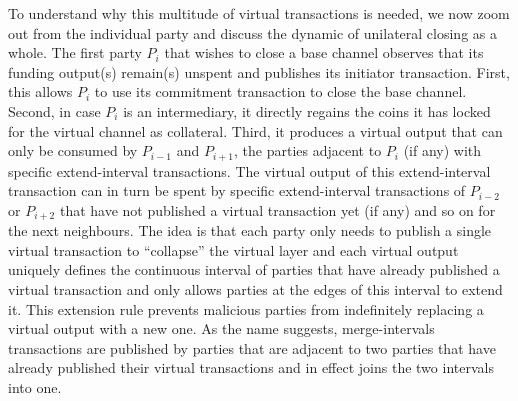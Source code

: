   To understand why this multitude of virtual transactions is needed, we now
  zoom out from the individual party and discuss the dynamic of unilateral
  closing as a
  whole. The first party $P_i$ that wishes to close a base channel observes that
  its funding output(s) remain(s) unspent and publishes its initiator
  transaction. First, this allows $P_i$ to use its commitment transaction to
  close the base channel. Second, in case $P_i$ is an intermediary, it directly
  regains the coins it has locked for the virtual channel as collateral. Third,
  it produces a
  virtual output that can only be consumed by $P_{i-1}$ and $P_{i+1}$, the
  parties adjacent to $P_i$ (if any) with specific extend-interval transactions.
  The virtual output of this extend-interval transaction can in turn be spent by
  specific extend-interval transactions of $P_{i-2}$ or $P_{i+2}$ that have not
  published a virtual transaction yet (if any) and so on for the next
  neighbours. The
  idea is that each party only needs to publish a single virtual transaction to
  ``collapse'' the virtual layer and each virtual output uniquely defines the
  continuous interval of parties that have already published a virtual
  transaction and only allows parties at the edges of this interval to extend it.
  This extension rule prevents malicious parties from indefinitely replacing a
  virtual output with a new one. As the name suggests, merge-intervals
  transactions are published by parties that are adjacent to two parties that
  have already published their virtual transactions and in effect joins the two
  intervals into one.

